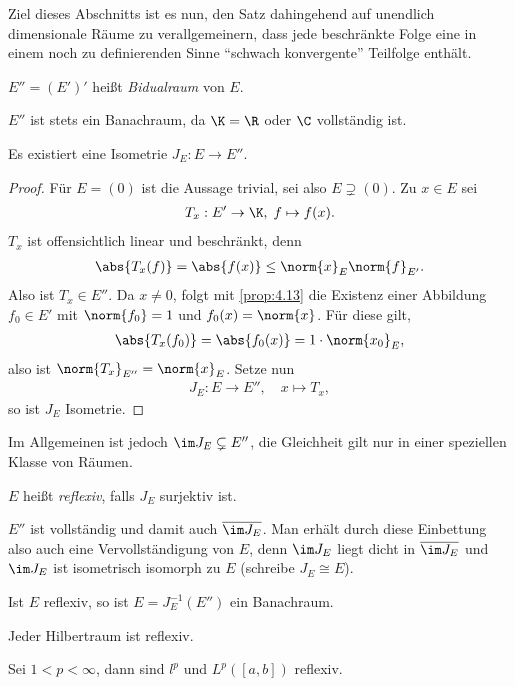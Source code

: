 Ziel dieses Abschnitts ist es nun, den Satz dahingehend auf unendlich
dimensionale Räume zu verallgemeinern, dass jede beschränkte Folge eine
in einem noch zu definierenden Sinne ``schwach konvergente'' Teilfolge enthält.

\begin{defn}
\label{defn:4.18}
$E'' = (E')'$ heißt \emph{Bidualraum} von
$E$.\fishhere
\end{defn}

$E''$ ist stets ein Banachraum, da $\K=\R$ oder $\C$ vollständig ist.

\begin{prop}[Einbettung]
\label{prop:4.19}
Es existiert eine Isometrie $J_E : E\to E''$.\fishhere
\end{prop}
\begin{proof}
Für $E=(0)$ ist die Aussage trivial, sei also $E\supsetneq (0)$.
Zu $x\in E$ sei
\begin{align*}
T_x : E'\to \K,\; f\mapsto f(x).
\end{align*}
$T_x$ ist offensichtlich
linear und beschränkt, denn
\begin{align*}
\abs{T_x(f)} = \abs{f(x)} \le \norm{x}_E\norm{f}_{E'}.
\end{align*}
Also ist $T_x\in E''$. Da $x\neq 0$,  folgt mit
\ref{prop:4.13} die Existenz einer Abbildung $f_0\in E'$ mit $\norm{f_0}=1$ und
$f_0(x)=\norm{x}$. Für diese gilt,
\begin{align*}
\abs{T_{x}(f_0)} = \abs{f_0(x)} = 1\cdot\norm{x_0}_E,
\end{align*}
also ist $\norm{T_{x}}_{E''}=\norm{x}_E$. Setze nun
\begin{align*}
J_E : E\to E'',\quad x\mapsto T_x,
\end{align*}
so ist $J_E$ Isometrie.\qedhere
\end{proof}

Im Allgemeinen ist jedoch $\im J_E \subsetneq E''$, die Gleichheit gilt nur in
einer speziellen Klasse von Räumen. 

\begin{defn}
\label{defn:4.20}
$E$ heißt \emph{reflexiv}, falls $J_E$ surjektiv
ist.\fishhere
\end{defn}

\begin{bem}[Bemerkungen.]
\label{bem:4.21}
\begin{bemenum}
\item $E''$ ist vollständig und damit auch $\overline{\im J_E}$. Man erhält
durch diese Einbettung also auch eine Vervollständigung von $E$, denn $\im
J_E$ liegt dicht in $\overline{\im J_E}$ und $\im J_E$ ist isometrisch
isomorph zu $E$ (schreibe $J_E\cong E$).
\item Ist $E$ reflexiv, so ist $E=J_E^{-1}(E'')$ ein Banachraum.
\item Jeder Hilbertraum ist reflexiv.
\item Sei $1<p<\infty$, dann sind $l^p$ und $L^p([a,b])$ reflexiv.\maphere
\end{bemenum}
\end{bem}

